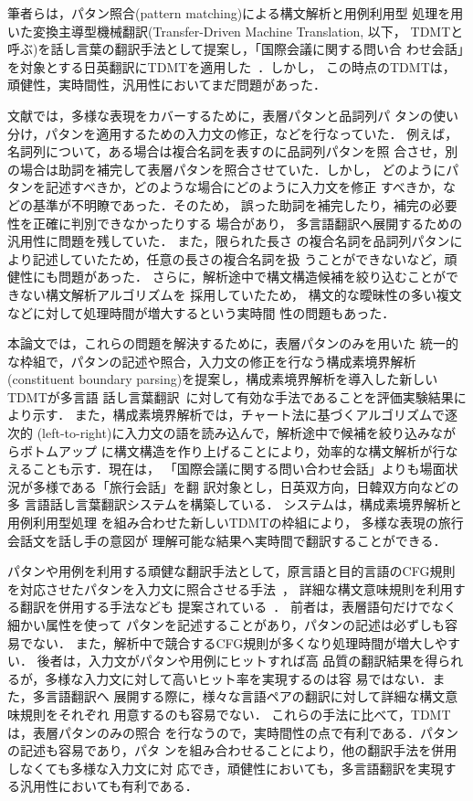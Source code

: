 筆者らは，パタン照合(pattern matching)による構文解析と用例利用型
処理を用いた変換主導型機械翻訳(Transfer-Driven Machine Translation, 以下，
TDMTと呼ぶ)を話し言葉の翻訳手法として提案し，「国際会議に関する問い合
わせ会話」を対象とする日英翻訳にTDMTを適用した~\cite{Furuse}．しかし，
この時点のTDMTは，頑健性，実時間性，汎用性においてまだ問題があった．

文献\cite{Furuse}では，多様な表現をカバーするために，表層パタンと品詞列パ
タンの使い分け，パタンを適用するための入力文の修正，などを行なっていた．
例えば，名詞列について，ある場合は複合名詞を表すのに品詞列パタンを照
合させ，別の場合は助詞を補完して表層パタンを照合させていた．しかし，
どのようにパタンを記述すべきか，どのような場合にどのように入力文を修正
すべきか，などの基準が不明瞭であった．そのため，
誤った助詞を補完したり，補完の必要性を正確に判別できなかったりする
場合があり，
多言語翻訳へ展開するための汎用性に問題を残していた．
また，限られた長さ
の複合名詞を品詞列パタンにより記述していたため，任意の長さの複合名詞を扱
うことができないなど，頑健性にも問題があった．
さらに，解析途中で構文構造候補を絞り込むことができない構文解析アルゴリズムを
採用していたため，
構文的な曖昧性の多い複文などに対して処理時間が増大するという実時間
性の問題もあった．

本論文では，これらの問題を解決するために，表層パタンのみを用いた
統一的な枠組で，パタンの記述や照合，入力文の修正を行なう構成素境界解析(constituent
boundary parsing)を提案し，構成素境界解析を導入した新しいTDMTが多言語
話し言葉翻訳~\cite{Furuse95,Yamamoto96}に対して有効な手法であることを評価実験結果により示す．
また，構成素境界解析では，チャート法に基づくアルゴリズムで逐次的
(left-to-right)に入力文の語を読み込んで，解析途中で候補を絞り込みながらボトムアップ
に構文構造を作り上げることにより，効率的な構文解析が行なえることも示す．現在は，
「国際会議に関する問い合わせ会話」よりも場面状況が多様である「旅行会話」を翻
訳対象とし，日英双方向，日韓双方向などの多
言語話し言葉翻訳システムを構築している．
システムは，構成素境界解析と用例利用型処理
を組み合わせた新しいTDMTの枠組により，
多様な表現の旅行会話文を話し手の意図が
理解可能な結果へ実時間で翻訳することができる．

パタンや用例を利用する頑健な翻訳手法として，原言語と目的言語のCFG規則
を対応させたパタンを入力文に照合させる手法~\cite{Watanabe}，
詳細な構文意味規則を利用する翻訳を併用する手法なども
提案されている~\cite{Brown,Kato,Shirai}．
前者は，表層語句だけでなく細かい属性を使って
パタンを記述することがあり，パタンの記述は必ずしも容易でない．
また，解析中で競合するCFG規則が多くなり処理時間が増大しやすい．
後者は，入力文がパタンや用例にヒットすれば高
品質の翻訳結果を得られるが，多様な入力文に対して高いヒット率を実現するのは容
易ではない．また，多言語翻訳へ
展開する際に，様々な言語ペアの翻訳に対して詳細な構文意味規則をそれぞれ
用意するのも容易でない．
これらの手法に比べて，TDMTは，表層パタンのみの照合
を行なうので，実時間性の点で有利である．パタンの記述も容易であり，パタ
ンを組み合わせることにより，他の翻訳手法を併用しなくても多様な入力文に対
応でき，頑健性においても，多言語翻訳を実現する汎用性においても有利である．

